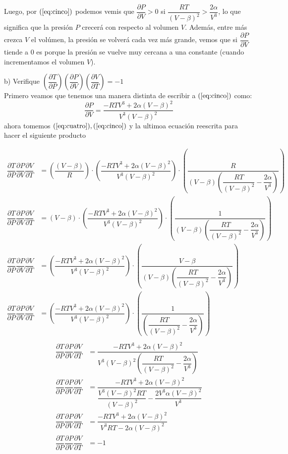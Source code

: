 \documentclass[letterpaper]{article}
\renewcommand{\d}{\partial}
\renewcommand{\*}{\cdot}
\theoremstyle{definition}
\begin{document}
Luego, por $ (\ref{eq:cinco}) $ podemos vemis que $ \dfrac{\d P}{\d V} > 0$ si $ \dfrac{RT}{(V - \beta)^2} > \dfrac{2\alpha}{V^3} $, lo que significa que la presión $ P $ crecerá con respecto al volumen $ V $. Además, entre más crezca $ V $ el volúmen, la presión se volverá cada vez más grande, vemos que si $ \dfrac{\d P}{\d V}  $ tiende a 0 es porque la presión se vuelve muy cercana a una constante (cuando incrementamos el volumen $ V $).

b) Verifique $ \left( \dfrac{\d T}{\d P}\right) \left( \dfrac{\d P}{\d V}\right)\left( \dfrac{\d V}{\d T}\right) = -1 $\\

Primero veamos que tenemos una manera distinta de escribir a $ (\ref{eq:cinco}) $  como:
\[ \dfrac{\d P}{\d V} = \dfrac{-RTV^3 + 2\alpha(V - \beta)^2}{V^3(V-\beta)^2} \]
ahora tomemos $ (\ref{eq:cuatro}),(\ref{eq:cinco}) $ y la ultimoa ecuación reescrita para hacer el siguiente producto

\begin{align*}
	\dfrac{\d T}{\d P}\dfrac{\d P}{\d V}\dfrac{\d V}{\d T} &= \left( \dfrac{(V - \beta)}{R}\right)\* \left(\dfrac{-RTV^3 + 2\alpha(V - \beta)^2}{V^3(V-\beta)^2}\right)\* \left(\dfrac{R}{(V - \beta)\left(\dfrac{RT}{(V - \beta)^2} - \dfrac{2\alpha}{V^3}\right) }\right)\\
	\dfrac{\d T}{\d P}\dfrac{\d P}{\d V}\dfrac{\d V}{\d T}&= \left(V - \beta \right)\* \left(\dfrac{-RTV^3 + 2\alpha(V - \beta)^2}{V^3(V-\beta)^2}\right)\* \left(\dfrac{1}{(V - \beta)\left(\dfrac{RT}{(V - \beta)^2} - \dfrac{2\alpha}{V^3}\right) }\right)\\
	\dfrac{\d T}{\d P}\dfrac{\d P}{\d V}\dfrac{\d V}{\d T} &= \left(\dfrac{-RTV^3 + 2\alpha(V - \beta)^2}{V^3(V-\beta)^2} \right)\* \left(\dfrac{V - \beta }{(V - \beta)\left(\dfrac{RT}{(V - \beta)^2} - \dfrac{2\alpha}{V^3}\right) }\right)\\
	\dfrac{\d T}{\d P}\dfrac{\d P}{\d V}\dfrac{\d V}{\d T} &= \left(\dfrac{-RTV^3 + 2\alpha(V - \beta)^2}{V^3(V-\beta)^2} \right)\* \left(\dfrac{1}{\left(\dfrac{RT}{(V - \beta)^2} - \dfrac{2\alpha}{V^3}\right) }\right)\\ %
\end{align*}
\begin{align*}
	\dfrac{\d T}{\d P}\dfrac{\d P}{\d V}\dfrac{\d V}{\d T} &=  \dfrac{-RTV^3 + 2\alpha(V - \beta)^2 }{ V^3(V-\beta)^2 \left( \dfrac{RT}{(V - \beta)^2} - \dfrac{ 2\alpha }{ V^3 } \right) }\\
	\dfrac{\d T}{\d P}\dfrac{\d P}{\d V}\dfrac{\d V}{\d T} &=  \dfrac{-RTV^3 + 2\alpha(V - \beta)^2 }{ \dfrac{V^3(V - \beta)^2 RT }{(V - \beta)^2} - \dfrac{2V^3 \alpha(V - \beta)^2 }{V^3}}\\
	\dfrac{\d T}{\d P}\dfrac{\d P}{\d V}\dfrac{\d V}{\d T} &=  \dfrac{-RTV^3 + 2\alpha(V - \beta)^2 }{ V^3RT - 2\alpha(V - \beta)^2 }\\
	\dfrac{\d T}{\d P}\dfrac{\d P}{\d V}\dfrac{\d V}{\d T} &= -1\\
\end{align*}
\end{document}
